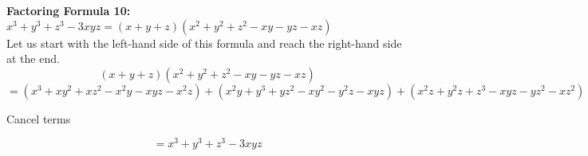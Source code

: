 \begin{framed}
  \noindent \textbf{Factoring Formula 10:} $x^3+y^3+z^3-3xyz=(x+y+z)(x^2+y^2+z^2-xy-yz-xz)$\\
  \noindent Let us start with the left-hand side of this formula and reach the 
  right-hand side at the end.\\
  \begin{equation*}
    (x+y+z)(x^2+y^2+z^2-xy-yz-xz)
  \end{equation*}
  \begin{equation*}
    = (x^3 + xy^2 + xz^2 - x^2y - xyz - x^2z)
    + (x^2y+y^3+yz^2-xy^2-y^2z-xyz)+(x^2z+y^2z+z^3-xyz-yz^2-xz^2)
  \end{equation*}
  \centerline{Cancel terms}
  \begin{equation*}
    =x^3+y^3+z^3 -3xyz
  \end{equation*}
\end{framed}

